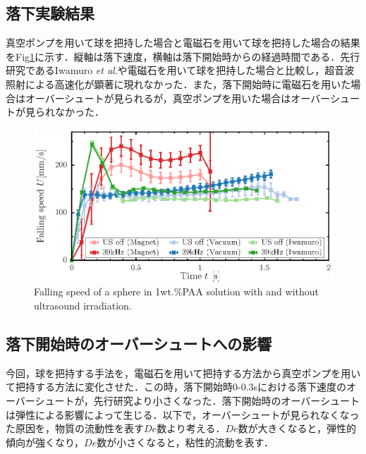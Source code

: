 
\subsection{落下実験結果}

真空ポンプを用いて球を把持した場合と電磁石を用いて球を把持した場合の結果をFig\ref{fig:falling-A}に示す．縦軸は落下速度，横軸は落下開始時からの経過時間である．先行研究であるIwamuro \textit{et al}.\cite{ref:8}や電磁石を用いて球を把持した場合と比較し，超音波照射による高速化が顕著に現れなかった．また，落下開始時に電磁石を用いた場合はオーバーシュートが見られるが，真空ポンプを用いた場合はオーバーシュートが見られなかった．

\begin{figure}[ht]
    \centering
    \includegraphics[width=1\textwidth]{./X-Appendix/magnet_vacuum/magnet_vacuum.eps}
    \caption{Falling speed of a sphere in 1wt.\%PAA solution with and without ultrasound irradiation.}
    \label{fig:falling-A}
\end{figure}

\clearpage

\subsection{落下開始時のオーバーシュートへの影響}
\label{sec:dis-de}

今回，球を把持する手法を，電磁石を用いて把持する方法から真空ポンプを用いて把持する方法に変化させた．この時，落下開始時0-0.3sにおける落下速度のオーバーシュートが，先行研究\cite{ref:8,ref:9}より小さくなった．落下開始時のオーバーシュートは弾性による影響によって生じる\cite{ref:12}．以下で，オーバーシュートが見られなくなった原因を，物質の流動性を表す$De$数より考える．$De$数が大きくなると，弾性的傾向が強くなり，$De$数が小さくなると，粘性的流動を表す．

